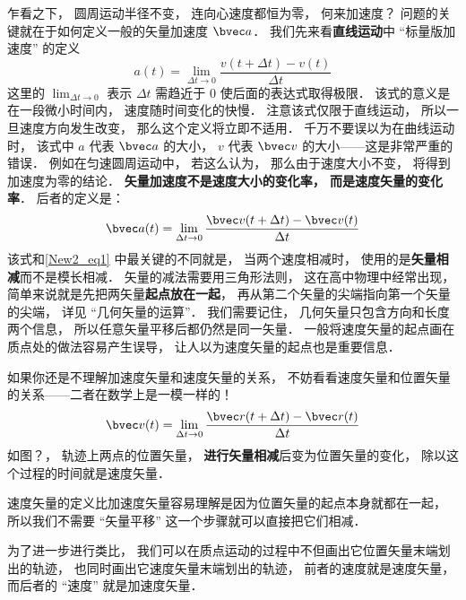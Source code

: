 乍看之下， 圆周运动半径不变， 连向心速度都恒为零， 何来加速度？ 问题的关键就在于如何定义一般的矢量加速度 $\bvec a$． 我们先来看\textbf{直线运动}中 “标量版加速度” 的定义
\begin{equation}\label{New2_eq1}
a(t) = \lim_{\Delta t\to 0}\frac{v(t+\Delta t) - v(t)}{\Delta t}
\end{equation}
这里的 $\lim_{\Delta t\to 0}$ 表示 $\Delta t$ 需趋近于 0 使后面的表达式取得极限． 该式的意义是在一段微小时间内， 速度随时间变化的快慢． 注意该式仅限于直线运动， 所以一旦速度方向发生改变， 那么这个定义将立即不适用． 千万不要误以为在曲线运动时， 该式中 $a$ 代表 $\bvec a$ 的大小， $v$ 代表 $\bvec v$ 的大小——这是非常严重的错误． 例如在匀速圆周运动中， 若这么认为， 那么由于速度大小不变， 将得到加速度为零的结论． \textbf{矢量加速度不是速度大小的变化率， 而是速度矢量的变化率}． 后者的定义是：
\begin{equation}\label{New2_eq2}
\bvec a(t) = \lim_{\Delta t\to 0}\frac{\bvec v(t+\Delta t) - \bvec v(t)}{\Delta t}
\end{equation}
该式和\autoref{New2_eq1} 中最关键的不同就是， 当两个速度相减时， 使用的是\textbf{矢量相减}而不是模长相减． 矢量的减法需要用三角形法则， 这在高中物理中经常出现， 简单来说就是先把两矢量\textbf{起点放在一起}， 再从第二个矢量的尖端指向第一个矢量的尖端， 详见 “几何矢量的运算”． 我们需要记住， 几何矢量只包含方向和长度两个信息， 所以任意矢量平移后都仍然是同一矢量． 一般将速度矢量的起点画在质点处的做法容易产生误导， 让人以为速度矢量的起点也是重要信息．

如果你还是不理解加速度矢量和速度矢量的关系， 不妨看看速度矢量和位置矢量的关系——二者在数学上是一模一样的！
\begin{equation}
\bvec v(t) = \lim_{\Delta t\to 0}\frac{\bvec r(t+\Delta t) - \bvec r(t)}{\Delta t}
\end{equation}
如图？， 轨迹上两点的位置矢量， \textbf{进行矢量相减}后变为位置矢量的变化， 除以这个过程的时间就是速度矢量．

速度矢量的定义比加速度矢量容易理解是因为位置矢量的起点本身就都在一起， 所以我们不需要 “矢量平移” 这一个步骤就可以直接把它们相减．

为了进一步进行类比， 我们可以在质点运动的过程中不但画出它位置矢量末端划出的轨迹， 也同时画出它速度矢量末端划出的轨迹， 前者的速度就是速度矢量， 而后者的 “速度” 就是加速度矢量．


